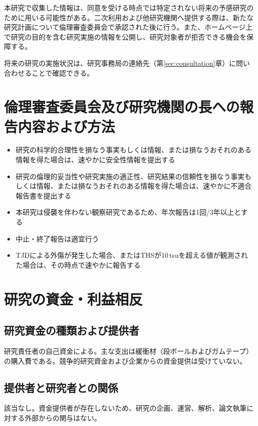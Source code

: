 \documentclass{kyodai-protocol}
\begin{document}
本研究で収集した情報は、同意を受ける時点では特定されない将来の予感研究のために用いる可能性がある。二次利用および他研究機関へ提供する際は、新たな研究計画について倫理審査委員会で承認された後に行う。また、ホームページ上で研究の目的を含む研究実施の情報を公開し、研究対象者が拒否できる機会を保障する。

将来の研究の実施状況は、研究事務局の連絡先（第\ref{sec:consultation}章）に問い合わせることで確認できる。

\section{倫理審査委員会及び研究機関の長への報告内容および方法}
\label{sec:reporting}

\begin{itemize}
\item 研究の科学的合理性を損なう事実もしくは情報、または損なうおそれのある情報を得た場合は、速やかに安全性情報を提出する
\item 研究の倫理的妥当性や研究実施の適正性、研究結果の信頼性を損なう事実もしくは情報、または損なうおそれのある情報を得た場合は、速やかに不適合報告書を提出する
\item 本研究は侵襲を伴わない観察研究であるため、年次報告は1回/3年以上とする
\item 中止・終了報告は適宜行う
\item TJDによる外傷が発生した場合、またはTHSが10\,tsuを超える値が観測された場合は、その時点で速やかに報告する
\end{itemize}

\section{研究の資金・利益相反}
\label{sec:funding-coi}

\subsection{研究資金の種類および提供者}

研究責任者の自己資金による。主な支出は緩衝材（段ボールおよびガムテープ）の購入費である。競争的研究資金および企業からの資金提供は受けていない。

\subsection{提供者と研究者との関係}

該当なし。資金提供者が存在しないため、研究の企画、運営、解析、論文執筆に対する外部からの関与はない。
\end{document}
